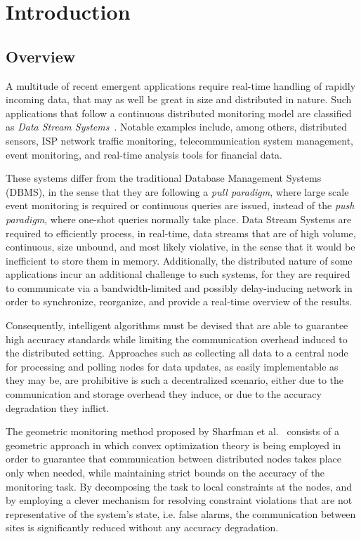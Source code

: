 \chapter{Introduction} \label{chap:intro}
\section{Overview} \label{sec:intro-overview}


A multitude of recent emergent applications require real-time handling of rapidly incoming data, that may as well be great in size and distributed in nature. Such applications that follow a continuous distributed monitoring model are classified as \emph{Data Stream Systems}~\cite{Babcock2002DataStreamSystems}. Notable examples include, among others, distributed sensors, ISP network traffic monitoring, telecommunication system management, event monitoring, and real-time analysis tools for financial data.

These systems differ from the traditional Database Management Systems (DBMS), in the sense that they are following a \emph{pull paradigm}, where large scale event monitoring is required or continuous queries are issued, instead of the \emph{push paradigm}, where one-shot queries normally take place. Data Stream Systems are required to efficiently process, in real-time, data streams that are of high volume, continuous, size unbound, and most likely violative, in the sense that it would be inefficient to store them in memory. Additionally, the distributed nature of some applications incur an additional challenge to such systems, for they are required to communicate via a bandwidth-limited and possibly delay-inducing network in order to synchronize, reorganize, and provide a real-time overview of the results.

Consequently, intelligent algorithms must be devised that are able to guarantee high accuracy standards while limiting the communication overhead induced to the distributed setting. Approaches such as collecting all data to a central node for processing and polling nodes for data updates, as easily implementable as they may be, are prohibitive is such a decentralized scenario, either due to the communication and storage overhead they induce, or due to the accuracy degradation they inflict. 

The geometric monitoring method proposed by Sharfman et al.~\cite{Sharfman2006GM} consists of a geometric approach in which convex optimization theory is being employed in order to guarantee that communication between distributed nodes takes place only when needed, while maintaining strict bounds on the accuracy of the monitoring task. By decomposing the task to local constraints at the  nodes, and by employing a clever mechanism for resolving constraint violations that are not representative of the system's state, i.e. false alarms, the communication between sites is significantly reduced without any accuracy degradation.

